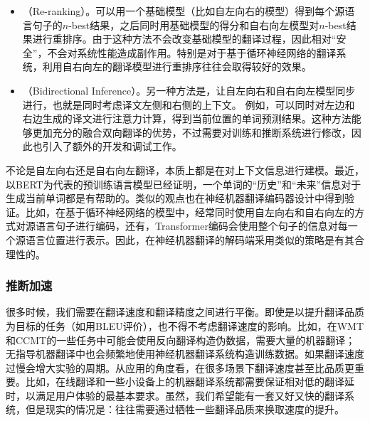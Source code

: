 \begin{itemize}
\vspace{0.5em}
\item {\small{}}（Re-ranking）。可以用一个基础模型（比如自左向右的模型）得到每个源语言句子的$n$-best结果，之后同时用基础模型的得分和自右向左模型对$n$-best结果进行重排序\cite{DBLP:conf/wmt/SennrichHB16,DBLP:conf/wmt/LiLXLLLWZXWFCLL19}。由于这种方法不会改变基础模型的翻译过程，因此相对``安全''，不会对系统性能造成副作用。特别是对于基于循环神经网络的翻译系统，利用自右向左的翻译模型进行重排序往往会取得较好的效果。
\vspace{0.5em}
\item {\small{}}（Bidirectional Inference）。另一种方法是，让自左向右和自右向左模型同步进行，也就是同时考虑译文左侧和右侧的上下文\cite{DBLP:conf/aaai/ZhangSQLJW18}。 例如，可以同时对左边和右边生成的译文进行注意力计算，得到当前位置的单词预测结果。这种方法能够更加充分的融合双向翻译的优势，不过需要对训练和推断系统进行修改，因此也引入了额外的开发和调试工作。
\vspace{0.5em}
\end{itemize}

\parinterval 不论是自左向右还是自右向左翻译，本质上都是在对上下文信息进行建模。最近，以BERT为代表的预训练语言模型已经证明，一个单词的``历史''和``未来''信息对于生成当前单词都是有帮助的\cite{DBLP:conf/naacl/DevlinCLT19}。类似的观点也在神经机器翻译编码器设计中得到验证。比如，在基于循环神经网络的模型中，经常同时使用自左向右和自右向左的方式对源语言句子进行编码，还有，Transformer编码会使用整个句子的信息对每一个源语言位置进行表示。因此，在神经机器翻译的解码端采用类似的策略是有其合理性的。


\subsubsection{推断加速}
\label{subsection-7.4.1.3}

\parinterval 很多时候，我们需要在翻译速度和翻译精度之间进行平衡。即使是以提升翻译品质为目标的任务（如用BLEU评价），也不得不考虑翻译速度的影响。比如，在WMT和CCMT的一些任务中可能会使用反向翻译构造伪数据，需要大量的机器翻译；无指导机器翻译中也会频繁地使用神经机器翻译系统构造训练数据。如果翻译速度过慢会增大实验的周期。从应用的角度看，在很多场景下翻译速度甚至比品质更重要。比如，在线翻译和一些小设备上的机器翻译系统都需要保证相对低的翻译延时，以满足用户体验的最基本要求。虽然，我们希望能有一套又好又快的翻译系统，但是现实的情况是：往往需要通过牺牲一些翻译品质来换取速度的提升。

